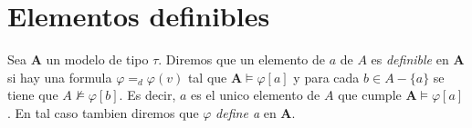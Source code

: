 \noproof

\section*{Elementos definibles}
\begin{definition}
Sea $\mathbf{A}$ un modelo de tipo $\tau$. Diremos que un elemento de $a$ de $A$ es \emph{definible} en $\mathbf{A}$
si hay una formula $\varphi =_d \varphi(v)$ tal que $\mathbf{A}\models\varphi[a]$ y para cada $b \in A -\{a\}$ se tiene que
$A\not\models\varphi[b]$. Es decir, $a$ es el unico elemento de $A$ que cumple $\mathbf{A}\models\varphi[a]$. En tal caso
tambien diremos que $\varphi$ \emph{define a} en $\mathbf{A}$.
\end{definition}
